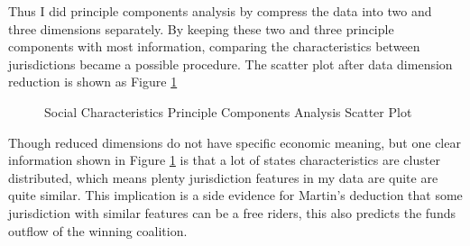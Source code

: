 Thus I did principle components analysis by compress the data into two and three dimensions separately. By keeping these two and three principle components with most information, comparing the characteristics between jurisdictions became a possible procedure. The scatter plot after data dimension reduction is shown as Figure \ref*{Figure 2.2}


\begin{figure}[H]
  \centering  %
  \caption[Principle Components Analysis Scatter Plot]{Social Characteristics Principle Components Analysis Scatter Plot}    %
  \label{Figure 2.2}    %
\end{figure}

Though reduced dimensions do not have specific economic meaning, but one clear information shown in Figure \ref*{Figure 2.2} is that a lot of states characteristics are cluster distributed, which means plenty jurisdiction features in my data are quite are quite similar. This implication is a side evidence for Martin's \cite{martin2018dividing} deduction that some jurisdiction with similar features can be a free riders, this also predicts the funds outflow of the winning coalition.

